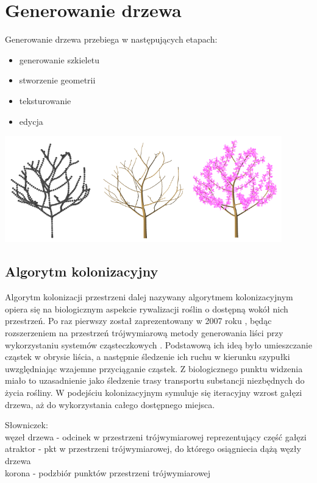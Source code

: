 \section{Generowanie drzewa}
Generowanie drzewa przebiega w następujących etapach:
\begin{itemize}
\item generowanie szkieletu
\item stworzenie geometrii
\item teksturowanie
\item edycja
\end{itemize}
\begin{center}
	\includegraphics[width=120mm]{images/colonization/generation.png}
	\label{colonization_generation}
\end{center}
\subsection{Algorytm kolonizacyjny}
Algorytm kolonizacji przestrzeni dalej nazywany algorytmem kolonizacyjnym opiera się na biologicznym aspekcie rywalizacji roślin o dostępną wokół nich przestrzeń. 
Po raz pierwszy został zaprezentowany w 2007 roku \cite{spaceColonization}, będąc rozszerzeniem na przestrzeń trójwymiarową metody generowania liści przy wykorzystaniu systemów cząsteczkowych \cite{particleMethod}. 
Podstawową ich ideą było umieszczanie cząstek w obrysie liścia, a następnie śledzenie ich ruchu w kierunku szypułki uwzględniając wzajemne przyciąganie cząstek. 
Z biologicznego punktu widzenia miało to uzasadnienie jako śledzenie trasy transportu substancji niezbędnych do życia rośliny. 
W podejściu kolonizacyjnym symuluje się iteracyjny wzrost gałęzi drzewa, aż do wykorzystania całego dostępnego miejsca.


Słowniczek:\\
węzeł drzewa - odcinek w przestrzeni trójwymiarowej reprezentujący część gałęzi\\
atraktor - pkt w przestrzeni trójwymiarowej, do którego osiągniecia dążą węzły drzewa\\
korona - podzbiór punktów przestrzeni trójwymiarowej\\
